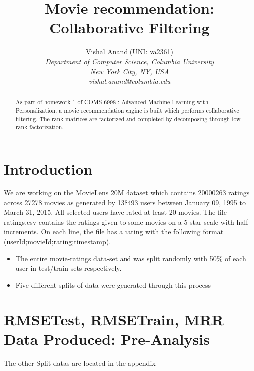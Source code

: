 \documentclass[10pt,conference,letterpaper]{IEEEtran}
\title{Movie recommendation: Collaborative Filtering}
\author{
{Vishal Anand (UNI: va2361)}
\vspace{1.6mm}\\
\fontsize{10}{10}\selectfont\itshape
Department of Computer Science, Columbia University\\
New York City, NY, USA\\
\fontsize{9}{9}\selectfont\ttfamily\upshape
vishal.anand@columbia.edu}
\begin{document}
\maketitle
%
\begin{abstract} 
As part of homework 1 of COMS-6998 : Advanced Machine Learning with Personalization, a movie recommendation engine is built which performs collaborative filtering. The rank matrices are factorized and completed by decomposing through low-rank factorization.
\end{abstract}

\section{Introduction}
We are working on the \href{http://files.grouplens.org/datasets/movielens/ml-20m.zip}{MovieLens 20M dataset} which contains 20000263 ratings across 27278 movies as generated by 138493 users between January 09, 1995 to March 31, 2015. All selected users have rated at least 20 movies. The file ratings.csv contains the ratings given to some movies on a 5-star scale with half-increments. On each line, the file has a rating with the following format (userId;movieId;rating;timestamp).

\begin{itemize}
\item The entire movie-ratings data-set and was split randomly with 50\% of each user in test/train sets respectively.
\item Five different splits of data were generated through this process
\end{itemize}

\section{RMSETest, RMSETrain, MRR Data Produced: Pre-Analysis}
The other Split datas are located in the appendix
\end{document}
